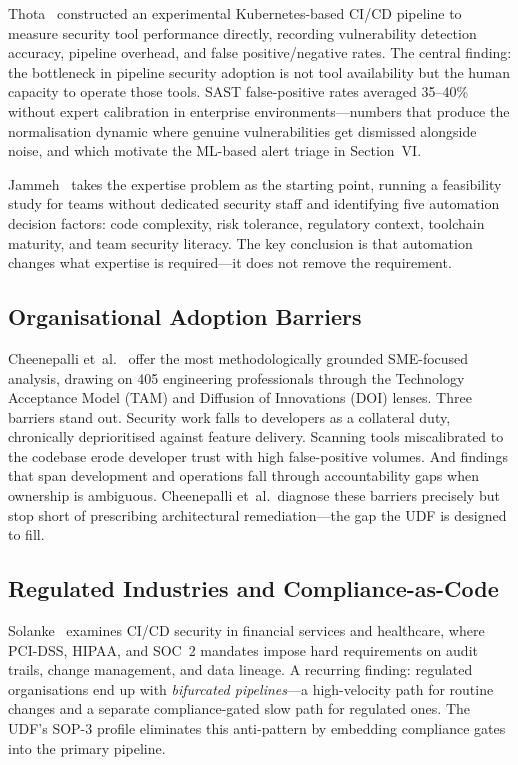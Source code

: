 \documentclass[letterpaper, 10pt, conference]{ieeeconf}
\begin{document}
Thota~\cite{thota2024} constructed an experimental Kubernetes-based
CI/CD pipeline to measure security tool performance directly, recording
vulnerability detection accuracy, pipeline overhead, and false
positive/negative rates. The central finding: the bottleneck in pipeline
security adoption is not tool availability but the human capacity to
operate those tools. SAST false-positive rates averaged 35--40\% without
expert calibration in enterprise environments---numbers that produce the
normalisation dynamic where genuine vulnerabilities get dismissed
alongside noise, and which motivate the ML-based alert triage in
Section~VI.

Jammeh~\cite{jammeh2020} takes the expertise problem as the starting
point, running a feasibility study for teams without dedicated security
staff and identifying five automation decision factors: code complexity,
risk tolerance, regulatory context, toolchain maturity, and team security
literacy. The key conclusion is that automation changes what expertise
is required---it does not remove the requirement.

\subsection{Organisational Adoption Barriers}

Cheenepalli et~al.~\cite{cheenepalli2025} offer the most methodologically
grounded SME-focused analysis, drawing on 405 engineering professionals
through the Technology Acceptance Model (TAM) and Diffusion of Innovations
(DOI) lenses. Three barriers stand out. Security work falls to developers
as a collateral duty, chronically deprioritised against feature delivery.
Scanning tools miscalibrated to the codebase erode developer trust with
high false-positive volumes. And findings that span development and
operations fall through accountability gaps when ownership is ambiguous.
Cheenepalli et~al.\ diagnose these barriers precisely but stop short of
prescribing architectural remediation---the gap the UDF is designed to
fill.

\subsection{Regulated Industries and Compliance-as-Code}

Solanke~\cite{solanke2022} examines CI/CD security in financial services
and healthcare, where PCI-DSS, HIPAA, and SOC~2 mandates impose hard
requirements on audit trails, change management, and data lineage. A
recurring finding: regulated organisations end up with \emph{bifurcated
pipelines}---a high-velocity path for routine changes and a separate
compliance-gated slow path for regulated ones. The UDF's SOP-3 profile
eliminates this anti-pattern by embedding compliance gates into the
primary pipeline.
\end{document}
